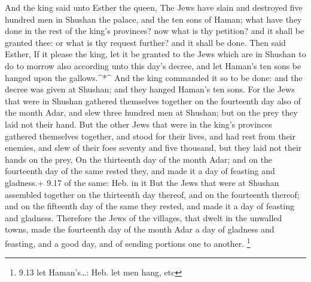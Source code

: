  And the king said unto Esther the queen, The Jews have
slain and destroyed five hundred men in Shushan the palace, and the ten
sons of Haman; what have they done in the rest of the king's provinces?
now what is thy petition? and it shall be granted thee: or what is thy
request further? and it shall be done.  Then said Esther,
If it please the king, let it be granted to the Jews which are in
Shushan to do to morrow also according unto this day's decree, and let
Haman's ten sons be hanged upon the gallows.\^{}*\^{}  And
the king commanded it so to be done: and the decree was given at
Shushan; and they hanged Haman's ten sons.  For the Jews
that were in Shushan gathered themselves together on the fourteenth day
also of the month Adar, and slew three hundred men at Shushan; but on
the prey they laid not their hand.  But the other Jews that
were in the king's provinces gathered themselves together, and stood for
their lives, and had rest from their enemies, and slew of their foes
seventy and five thousand, but they laid not their hands on the prey,
 On the thirteenth day of the month Adar; and on the
fourteenth day of the same rested they, and made it a day of feasting
and gladness.+ 9.17 of the same: Heb. in it  But the Jews
that were at Shushan assembled together on the thirteenth day thereof,
and on the fourteenth thereof; and on the fifteenth day of the same they
rested, and made it a day of feasting and gladness. 
Therefore the Jews of the villages, that dwelt in the unwalled towns,
made the fourteenth day of the month Adar a day of gladness and
feasting, and a good day, and of sending portions one to another.
\footnote{9.13 let Haman's\ldots: Heb. let men hang, etc}

